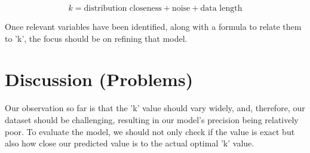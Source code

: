 \documentclass{article}
\begin{document}
$$ k  =  \text{distribution closeness} + \text{noise} + \text{data length} $$

Once relevant variables have been identified, along with a formula to relate them to 'k', the focus should be on refining that model.

\section{Discussion (Problems)}

Our observation so far is that the 'k' value should vary widely, and, therefore, our dataset should be challenging, resulting in our model's precision being relatively poor. To evaluate the model, we should not only check if the value is exact but also how close our predicted value is to the actual optimal 'k' value.
\end{document}
